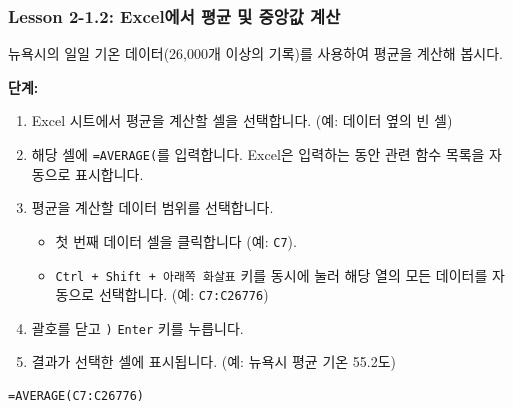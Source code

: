 \documentclass[11pt,a4paper]{article}
\theoremstyle{definition}
\begin{document}
\newpage
\subsubsection*{Lesson 2-1.2: Excel에서 평균 및 중앙값 계산}

\begin{examplebox}[title={Excel에서 평균 계산하기 (\texttt{AVERAGE} 함수)}]
뉴욕시의 일일 기온 데이터(26,000개 이상의 기록)를 사용하여 평균을 계산해 봅시다.

\textbf{단계:}
\begin{enumerate}
    \item Excel 시트에서 평균을 계산할 셀을 선택합니다. (예: 데이터 옆의 빈 셀)
    \item 해당 셀에 \texttt{=AVERAGE(}를 입력합니다. Excel은 입력하는 동안 관련 함수 목록을 자동으로 표시합니다.
    \item 평균을 계산할 데이터 범위를 선택합니다.
    \begin{itemize}
        \item 첫 번째 데이터 셀을 클릭합니다 (예: \texttt{C7}).
        \item \texttt{Ctrl + Shift + 아래쪽 화살표} 키를 동시에 눌러 해당 열의 모든 데이터를 자동으로 선택합니다. (예: \texttt{C7:C26776})
    \end{itemize}
    \item 괄호를 닫고 \texttt{)} \texttt{Enter} 키를 누릅니다.
    \item 결과가 선택한 셀에 표시됩니다. (예: 뉴욕시 평균 기온 55.2도)
\end{enumerate}
\begin{lstlisting}[caption={Excel AVERAGE 함수 사용 예시}, label={lst:excel_average}]
=AVERAGE(C7:C26776)
\end{lstlisting}
\end{examplebox}
\end{document}
